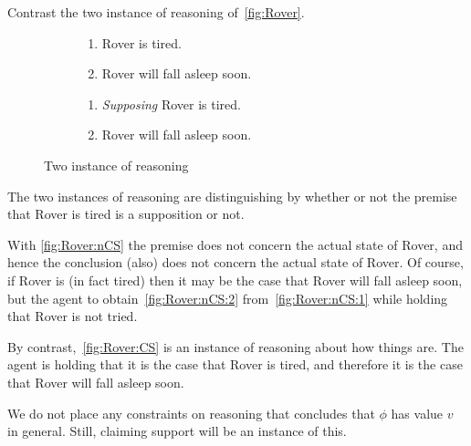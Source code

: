 \begin{note}
  Contrast the two instance of reasoning of~\autoref{fig:Rover}.
  \begin{figure}[h!]
    \mbox{}\hfill
    \begin{subfigure}{0.45\linewidth}
      \begin{enumerate}
      \item
        \label{fig:Rover:CS:1}
        Rover is tired.
      \item
        \label{fig:Rover:CS:2}
        Rover will fall asleep soon.
      \end{enumerate}
      \caption{}
      \label{fig:Rover:CS}
    \end{subfigure}
    \hfill
    \begin{subfigure}{0.45\linewidth}
      \begin{enumerate}[label=\arabic*\('\).,ref=(\arabic*\('\))]
      \item
        \label{fig:Rover:nCS:1}
        \emph{Supposing} Rover is tired.
      \item
        \label{fig:Rover:nCS:2}
        Rover will fall asleep soon.
      \end{enumerate}
      \caption{}
      \label{fig:Rover:nCS}
    \end{subfigure}
    \hfill\mbox{}
    \caption{Two instance of reasoning}
    \label{fig:Rover}
  \end{figure}
\end{note}

\begin{note}
  The two instances of reasoning are distinguishing by whether or not the premise that Rover is tired is a supposition or not.

  With \autoref{fig:Rover:nCS} the premise does not concern the actual state of Rover, and hence the conclusion (also) does not concern the actual state of Rover.
  Of course, if Rover is (in fact tired) then it may be the case that Rover will fall asleep soon, but the agent to obtain~\ref{fig:Rover:nCS:2} from~\ref{fig:Rover:nCS:1} while holding that Rover is not tried.

  By contrast,~\autoref{fig:Rover:CS} is an instance of reasoning about how things are.
  The agent is holding that it is the case that Rover is tired, and therefore it is the case that Rover will fall asleep soon.
\end{note}

\begin{note}
  We do not place any constraints on reasoning that concludes that \(\phi\) has value \(v\) in general.
  Still, claiming support will be an instance of this.
\end{note}

